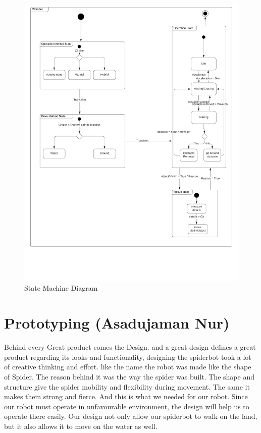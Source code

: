 \documentclass[10pt,journal,compsoc]{IEEEtran}
\begin{document}
\begin{figure}[h]
\includegraphics[scale=0.4]{State}
\caption{State Machine Diagram}
\label{fig:state}
\end{figure}

\section{Prototyping (Asadujaman Nur)}

Behind every Great product comes the Design. and a great design defines a great product regarding its looks and functionality, designing the spiderbot took a lot of creative thinking and effort. like the name the robot was made like the shape of Spider. The reason behind it was the way the spider was built. The shape and structure give the spider mobility and flexibility during movement. The same it makes them strong and fierce. And this is what we needed for our robot. Since our robot must operate in unfavourable environment, the design will help us to operate there easily. Our design not only allow our spiderbot to walk on the land, but it also allows it to move on the water as well.
\end{document}
